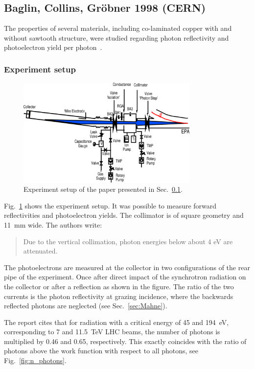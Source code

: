 \subsection{Baglin, Collins, Gröbner 1998 (CERN)}
\label{sec:Baglin}

The properties of several materials, including co-laminated copper with and without sawtooth structure, were studied regarding photon reflectivity and photoelectron yield per photon~\cite{baglin}.

\subsubsection{Experiment setup}

\begin{figure}[tbh]
    \centering
    \includegraphics[width=0.8\textwidth]{../ss/experiment_baglin.png}
    \caption{Experiment setup of the paper presented in Sec.~\ref{sec:Baglin}.}
    \label{fig:exp}
\end{figure}


Fig.~\ref{fig:exp} shows the experiment setup.
It was possible to measure forward reflectivities and photoelectron yields.
The collimator is of square geometry and 11~mm wide.
The authors write:
\begin{quote}
    \small
    Due to the vertical collimation, photon energies below about 4 eV are attenuated.
\end{quote}

The photoelectrons are measured at the collector in two configurations of the rear pipe of the experiment.
Once after direct impact of the synchrotron radiation on the collector or after a reflection as shown in the figure.
The ratio of the two currents is the photon reflectivity at grazing incidence, where the backwards reflected photons are neglected (see Sec.~\ref{sec:Mahne}).

The report cites that for radiation with a critical energy of 45 and 194~eV, corresponding to 7 and 11.5~TeV LHC beams, the number of photons is multiplied by 0.46 and 0.65, respectively.
This exactly coincides with the ratio of photons above the work function with respect to all photons, see Fig.~\ref{fig:n_photons}.



